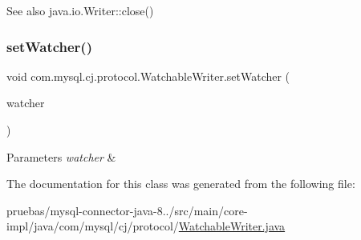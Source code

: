 \begin{DoxySeeAlso}{See also}
java.\+io.\+Writer\+::close() 
\end{DoxySeeAlso}
\mbox{\label{classcom_1_1mysql_1_1cj_1_1protocol_1_1_watchable_writer_a272405ad2681cae2078138b821e0c324}} 
\subsubsection{\texorpdfstring{set\+Watcher()}{setWatcher()}}
{\footnotesize\ttfamily void com.\+mysql.\+cj.\+protocol.\+Watchable\+Writer.\+set\+Watcher (\begin{DoxyParamCaption}\item[{\mbox{\hyperlink{interfacecom_1_1mysql_1_1cj_1_1protocol_1_1_writer_watcher}{Writer\+Watcher}}}]{watcher }\end{DoxyParamCaption})}


\begin{DoxyParams}{Parameters}
{\em watcher} & \\
\hline
\end{DoxyParams}


The documentation for this class was generated from the following file\+:\begin{DoxyCompactItemize}
\item 
pruebas/mysql-\/connector-\/java-\/8../src/main/core-\/impl/java/com/mysql/cj/protocol/\mbox{\hyperlink{_watchable_writer_8java}{Watchable\+Writer.\+java}}\end{DoxyCompactItemize}
